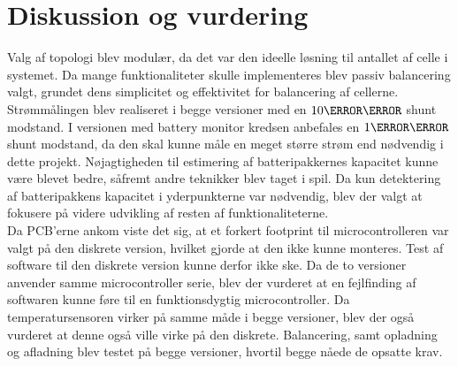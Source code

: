 \chapter{Diskussion og vurdering}\label{kap:diskussion}
Valg af topologi blev modulær, da det var den ideelle løsning til antallet af celle i systemet. Da mange funktionaliteter skulle implementeres blev passiv balancering valgt, grundet dens simplicitet og effektivitet for balancering af cellerne.
\\

Strømmålingen blev realiseret i begge versioner med en $10\milli\ohm$ shunt modstand. I versionen med battery monitor kredsen anbefales en $1\milli\ohm$ shunt modstand, da den skal kunne måle en meget større strøm end nødvendig i dette projekt. Nøjagtigheden til estimering af batteripakkernes kapacitet kunne være blevet bedre, såfremt andre teknikker blev taget i spil. Da kun detektering af batteripakkens kapacitet i yderpunkterne var nødvendig, blev der valgt at fokusere på videre udvikling af resten af funktionaliteterne.
\\

Da PCB'erne ankom viste det sig, at et forkert footprint til microcontrolleren var valgt på den diskrete version, hvilket gjorde at den ikke kunne monteres. Test af software til den diskrete version kunne derfor ikke ske. Da de to versioner anvender samme microcontroller serie, blev der vurderet at en fejlfinding af softwaren kunne føre til en funktionsdygtig microcontroller. Da temperatursensoren virker på samme måde i begge versioner, blev der også vurderet at denne også ville virke på den diskrete. Balancering, samt opladning og afladning blev testet på begge versioner, hvortil begge nåede de opsatte krav.
